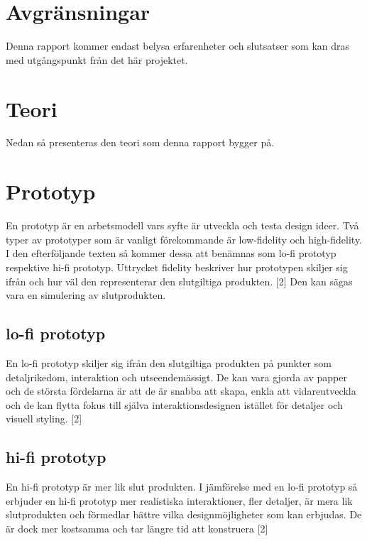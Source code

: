 \section{Avgränsningar}
Denna rapport kommer endast belysa erfarenheter och slutsatser som kan dras med utgångspunkt från det här projektet.

\section{Teori}
Nedan så presenteras den teori som denna rapport bygger på.

\section{Prototyp}
En prototyp är en arbetsmodell vars syfte är utveckla och testa design ideer. Två typer av prototyper som är vanligt förekommande är low-fidelity och high-fidelity. I den efterföljande texten så  kommer dessa att benämnas som lo-fi prototyp respektive hi-fi prototyp. Uttrycket fidelity beskriver hur prototypen skiljer sig ifrån och hur väl den representerar den slutgiltiga produkten. [2]  Den kan sägas vara en simulering av slutprodukten.     

\subsection{lo-fi prototyp}
En lo-fi prototyp skiljer sig ifrån den slutgiltiga produkten på punkter som detaljrikedom, interaktion och utseendemässigt. De kan vara gjorda av papper och de största fördelarna är att de är snabba att skapa, enkla att vidareutveckla  och de kan flytta fokus till själva interaktionsdesignen istället för detaljer och visuell styling. [2]

\subsection{hi-fi prototyp}
En hi-fi prototyp är mer lik slut produkten.  I jämförelse med en lo-fi prototyp så erbjuder en hi-fi prototyp mer realistiska interaktioner, fler detaljer, är mera lik slutprodukten och förmedlar bättre vilka designmöjligheter som kan erbjudas. De är dock mer kostsamma och tar längre tid att konstruera  [2]

